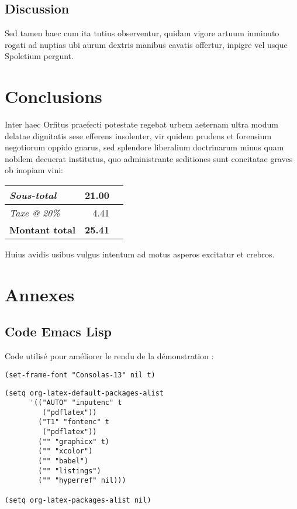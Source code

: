 \documentclass[french]{report}
\begin{document}
\chapter{Discussion}
\label{sec:orga21736c}

Sed tamen haec cum ita tutius observentur, quidam vigore artuum inminuto rogati
ad nuptias ubi aurum dextris manibus cavatis offertur, inpigre vel usque
Spoletium pergunt.

\part{Conclusions}
\label{sec:org67bf2c9}

Inter haec Orfitus praefecti potestate regebat urbem aeternam ultra modum
delatae dignitatis sese efferens insolenter, vir quidem prudens et forensium
negotiorum oppido gnarus, sed splendore liberalium doctrinarum minus quam
nobilem decuerat institutus, quo administrante seditiones sunt concitatae graves
ob inopiam vini:

\begin{center}
\begin{tabular}{lrl}
\emph{Sous-total} & 21.00 & \texteuro{}\\
\hline
\emph{Taxe @ 20\%} & 4.41 & \texteuro{}\\
\hline
\textbf{Montant total} & \textbf{\large 25.41} & \textbf{\texteuro{}}\\
\end{tabular}
\end{center}

Huius avidis usibus vulgus intentum ad motus asperos excitatur et crebros.

\part{Annexes}
\label{sec:orgb50fa3a}

\chapter{Code Emacs Lisp}
\label{sec:org4da598a}

Code utilisé pour améliorer le rendu de la démonstration :

\lstset{language=Lisp,label= ,caption= ,captionpos=b,numbers=none}
\begin{lstlisting}
(set-frame-font "Consolas-13" nil t)
\end{lstlisting}

\lstset{language=Lisp,label= ,caption= ,captionpos=b,numbers=none}
\begin{lstlisting}
(setq org-latex-default-packages-alist
      '(("AUTO" "inputenc" t
         ("pdflatex"))
        ("T1" "fontenc" t
         ("pdflatex"))
        ("" "graphicx" t)
        ("" "xcolor")
        ("" "babel")
        ("" "listings")
        ("" "hyperref" nil)))

(setq org-latex-packages-alist nil)
\end{lstlisting}
\end{document}
